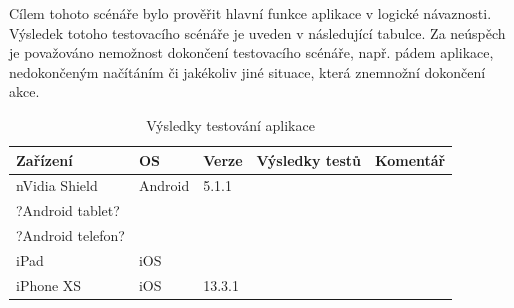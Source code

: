 Cílem tohoto scénáře bylo prověřit hlavní funkce aplikace v logické návaznosti. Výsledek totoho testovacího scénáře je uveden v následující tabulce. Za neúspěch je považováno nemožnost dokončení testovacího scénáře, např. pádem aplikace, nedokončeným načítáním či jakékoliv jiné situace, která znemnožní dokončení akce.

\begin{table}[H]
	\begin{tabularx}{\textwidth}{|X|X|X|X|X|}
		\hline
		Zařízení        & OS      & Verze  & Výsledky testů & Komentář \\ \hline
		nVidia Shield   & Android & 5.1.1  &                &          \\ \hline
		?Android tablet?  &         &        &                &          \\ \hline
		?Android telefon? &         &        &                &          \\ \hline
		iPad            & iOS     &        &                &          \\ \hline
		iPhone XS       & iOS     & 13.3.1 &                &          \\ \hline
	\end{tabularx}
	\caption{Výsledky testování aplikace}
\end{table}
